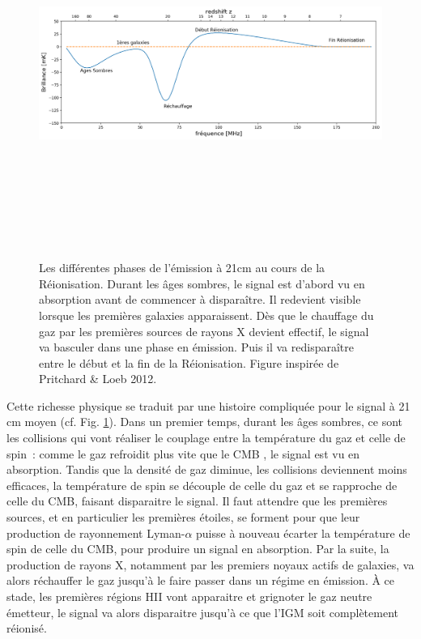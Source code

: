 \begin{figure}[htbp]
	\centering
		\includegraphics[height=12cm]{figs/21cm.png}
		\caption[L'histoire du signal à 21cm de la Réionisation]{Les différentes phases de l'émission à 21cm au cours de la Réionisation. Durant les âges sombres, le signal est d'abord vu en absorption avant de commencer à disparaître. Il redevient visible lorsque les premières galaxies apparaissent. Dès que le chauffage du gaz par les premières sources de rayons X devient effectif, le signal va basculer dans une phase en émission. Puis il va redisparaître entre le début et la fin de la Réionisation. Figure inspirée de Pritchard \& Loeb 2012.}
	\label{f:21cm}
\end{figure} 

Cette richesse physique se traduit par une histoire compliquée pour le signal à 21 cm moyen (cf. Fig. \ref{f:21cm}). Dans un premier temps, durant les âges sombres, ce sont les collisions qui vont réaliser le couplage entre la température du gaz et celle de spin~: comme le gaz refroidit plus vite que le CMB , le signal est vu en absorption. Tandis que la densité de gaz diminue, les collisions deviennent moins efficaces, la température de spin se découple de celle du gaz et se rapproche de celle du CMB, faisant disparaitre le signal. Il faut attendre que les premières sources, et en particulier les premières étoiles, se forment pour que leur production de rayonnement Lyman-$\alpha$ puisse à nouveau écarter la température de spin de celle du CMB, pour produire un signal en absorption. Par la suite, la production de rayons X, notamment par les premiers noyaux actifs de galaxies, va alors réchauffer le gaz jusqu'à le faire passer dans un régime en émission. À ce stade, les premières régions HII vont apparaitre et grignoter le gaz neutre émetteur, le signal va alors disparaitre jusqu'à ce que l'IGM soit complètement réionisé.

